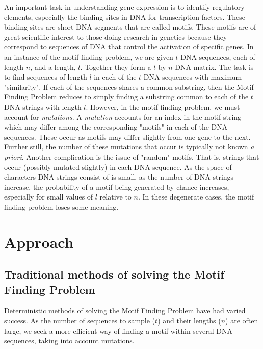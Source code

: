 \documentclass{bioinfo}
\begin{document}
 An important task in understanding gene expression is to identify regulatory elements, especially the binding sites in DNA for transcription factors. These binding sites are short DNA segments that are called motifs. These motifs are of great scientific interest to those doing research in genetics because they correspond to sequences of DNA that control the activation of specific genes. \linebreak \linebreak
In an instance of the motif finding problem, we are given $t$ DNA sequences, each of length $n$, and a length, $l$. Together they form a $t$ by $n$ DNA matrix.
The task is to find sequences of length $l$ in each of the $t$ DNA sequences with maximum "similarity". If each of the sequences shares a common substring, then the Motif Finding Problem reduces to simply finding a substring common to each of the $t$ DNA strings with length $l$. However, in the motif finding problem, we must account for \textit{mutations}. A \textit{mutation} accounts for an index in the motif string which may differ among the corresponding "motifs" in each of the DNA sequences. These occur as motifs may differ slightly from one gene to the next. Further still, the number of these mutations that occur is typically not known \textit{a priori}. 
\linebreak \linebreak
Another complication is the issue of "random" motifs. That is, strings that occur (possibly mutated slightly) in each DNA sequence. As the space of characters DNA strings consist of is small, as the number of DNA strings increase, the probability of a motif being generated by chance increases, especially for small values of $l$ relative to $n$. In these degenerate cases, the motif finding problem loses some meaning.

\section{Approach}
\subsection{Traditional methods of solving the Motif Finding Problem}
Deterministic methods of solving the Motif Finding Problem have had varied success.\citep{Das} As the number of sequences to sample ($t$) and their lengths ($n$) are often large, we seek a more efficient way of finding a motif within several DNA sequences, taking into account mutations. 
\end{document}
